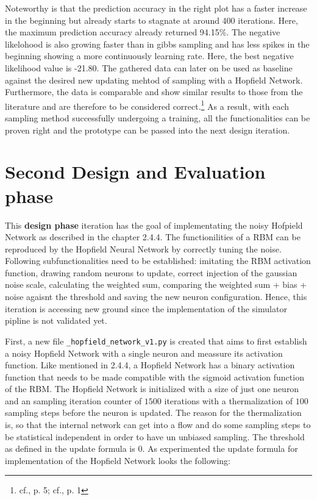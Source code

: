 Noteworthy is that the prediction accuracy in the right plot has a faster increase in the beginning but already starts to stagnate at around 400 iterations. 
Here, the maximum prediction accuracy already returned 94.15\%. 
The negative likelohood is also growing faster than in gibbs sampling and has less spikes in the beginning showing a more continuously learning rate.
Here, the best negative likelihood value is -21.80.
The gathered data can later on be used as baseline against the desired new updating mehtod of sampling with a Hopfield Network.
Furthermore, the data is comparable and show similar results to those from the literature and are therefore to be considered correct.\footnote{cf.\cite{bohmNoiseinjectedAnalogIsing2022a}, p. 5; cf.\cite{RestrictedBoltzmannMachine}, p. 1}
As a result, with each sampling method successfully undergoing a training, all the functionalities can be proven right and the prototype can be passed 
into the next design iteration.


\section{Second Design and Evaluation phase}

This \textbf{design phase} iteration has the goal of implementating the noisy Hofpield Network as described in the chapter 2.4.4. 
The functionilities of a \ac{RBM} can be reproduced by the Hopfield Neural Network by correctly tuning the noise.
Following subfunctionalities need to be established: imitating the \ac{RBM} activation function, drawing random neurons to update,
correct injection of the gaussian noise scale, calculating the weighted sum,
comparing the weighted sum + bias + noise agaisnt the threshold and saving the new neuron configuration.
Hence, this iteration is accessing new ground since the implementation of the simulator pipline is not validated yet. 

First, a new file \texttt{\_hopfield\_network\_v1.py} is created that aims to first establish a noisy Hopfield Network with a single neuron 
and meassure its activation function.
Like mentioned in 2.4.4, a Hopfield Network has a binary activation function that needs to be made compatible with the sigmoid activation function of the \ac{RBM}.
The Hopfield Network is initialized with a size of just one neuron and an sampling iteration counter of \(1500\) iterations with a thermalization of \(100\) sampling steps before 
the neuron is updated.
The reason for the thermalization is, so that the internal network can get into a flow and do some sampling steps to be statistical independent in order to have un unbiased sampling.
The threshold as defined in the update formula is \(0\). 
As experimented the update formula for implementation of the Hopfield Network looks the following:

